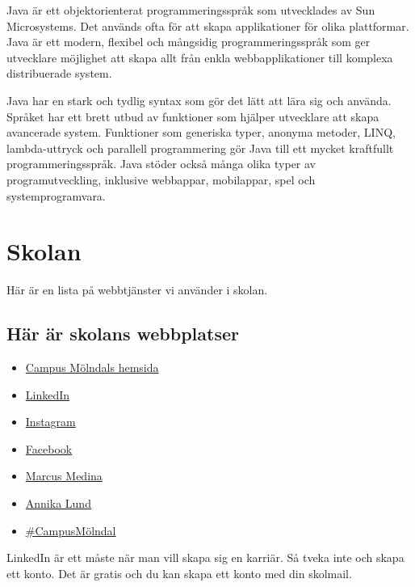 Java är ett objektorienterat programmeringsspråk som utvecklades av Sun
Microsystems. Det används ofta för att skapa applikationer för olika
plattformar. Java är ett modern, flexibel och mångsidig
programmeringsspråk som ger utvecklare möjlighet att skapa allt från
enkla webbapplikationer till komplexa distribuerade system.

Java har en stark och tydlig syntax som gör det lätt att lära sig och
använda. Språket har ett brett utbud av funktioner som hjälper
utvecklare att skapa avancerade system. Funktioner som generiska typer,
anonyma metoder, LINQ, lambda-uttryck och parallell programmering gör
Java till ett mycket kraftfullt programmeringsspråk. Java stöder också
många olika typer av programutveckling, inklusive webbappar, mobilappar,
spel och systemprogramvara.

\hypertarget{skolan}{%
\section{Skolan}\label{skolan}}

Här är en lista på webbtjänster vi använder i skolan.

\hypertarget{huxe4r-uxe4r-skolans-webbplatser}{%
\subsection{Här är skolans
webbplatser}\label{huxe4r-uxe4r-skolans-webbplatser}}

\begin{itemize}
\item
  \href{https://campus.molndal.se}{Campus Mölndals hemsida}
\item
  \href{https://www.linkedin.com/school/campus-molndal/}{LinkedIn}
\item
  \href{https://www.instagram.com/yh_campusmolndal_it/}{Instagram}
\item
  \href{https://www.facebook.com/campusmolndal/}{Facebook}
\item
  \href{https://www.linkedin.com/in/marcusmedina/?locale=sv_SE}{Marcus
  Medina}
\item
  \href{https://www.linkedin.com/in/annika-lund-profile/}{Annika Lund}
\item
  \href{https://www.linkedin.com/search/results/all/?keywords=\%23campusm\%C3\%B6lndal&origin=GLOBAL_SEARCH_HEADER&sid=gtu}{\#CampusMölndal}
\end{itemize}

LinkedIn är ett måste när man vill skapa sig en karriär. Så tveka inte
och skapa ett konto. Det är gratis och du kan skapa ett konto med din
skolmail.

